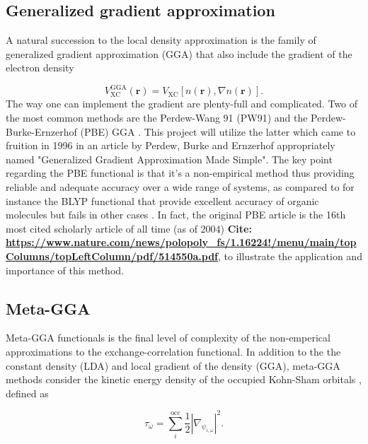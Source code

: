 \subsection{Generalized gradient approximation}
A natural succession to the local density approximation is the family of generalized gradient approximation (GGA) that also include the gradient of the electron density

\begin{equation}
V_\text{XC} ^\text{GGA} (\boldsymbol{r}) = V_\text{XC} [n(\boldsymbol{r}), \nabla n(\boldsymbol{r})].
\end{equation}
The way one can implement the gradient are plenty-full and complicated. Two of the most common methods are the Perdew-Wang 91 (PW91) \cite{pw91} and the Perdew-Burke-Ernzerhof (PBE) GGA \cite{pbe}. This project will utilize the latter which came to fruition in  1996 in an article by Perdew, Burke and Ernzerhof appropriately named "Generalized Gradient Approximation Made Simple". The key point regarding the PBE functional is that it's a non-empirical method thus providing reliable and adequate accuracy over a wide range of systems, as compared to for instance the BLYP functional that provide excellent accuracy of organic molecules but fails in other cases \cite{PBE_forum}. In fact, the original PBE article is the 16th most cited scholarly article of all time (as of 2004) \textbf{Cite: \url{https://www.nature.com/news/polopoly_fs/1.16224!/menu/main/topColumns/topLeftColumn/pdf/514550a.pdf}}, to illustrate the application and importance of this method. 

\subsection{Meta-GGA}   
Meta-GGA functionals is the final level of  complexity of the non-emperical approximations to the exchange-correlation functional. In addition to the the constant density (LDA) and local gradient of the density (GGA), meta-GGA methods consider the kinetic energy density of the occupied Kohn-Sham orbitals \cite{metagga}, defined as
 
\begin{equation}
	\tau_\omega = \sum_i ^\text{occ}\frac{1}{2}|\nabla_{\psi_{i, \omega}}|^2.
\end{equation}

